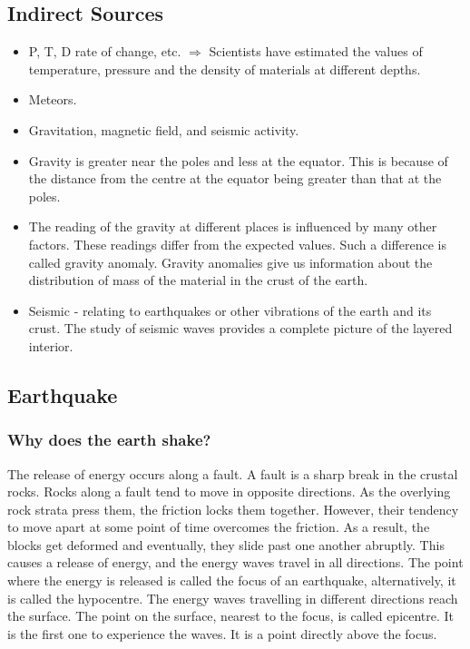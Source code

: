 \documentclass[8pt, a4paper, oneside, twocolumn]{extarticle}
\begin{document}
\subsection{Indirect Sources}
\begin{itemize}
  \item P, T, D rate of change, etc. $\Rightarrow$ Scientists have estimated the values of temperature, pressure and the density of materials at different depths.
  \item Meteors.
  \item Gravitation, magnetic field, and seismic activity.
  \item Gravity is greater near the poles and less at the equator. This is because of the distance from the centre at the equator being greater than that at the poles.
  \item The reading of the gravity at different places is influenced by many other factors. These readings differ from the expected values. Such a difference is called gravity anomaly. Gravity anomalies give us information about the distribution of mass of the material in the crust of the earth.
  \item Seismic - relating to earthquakes or other vibrations of the earth and its crust. The study of seismic waves provides a complete picture of the layered interior. 
  
\end{itemize}

\subsection{Earthquake}
\subsubsection{Why does the earth shake?}
The release of energy occurs along a fault. A fault is a sharp break in the crustal rocks. Rocks along a fault tend to move in opposite directions. As the overlying rock strata press them, the friction locks them together. However, their tendency to move apart at some point of time overcomes the friction. As a result, the blocks get deformed and eventually, they slide past one another abruptly. This causes a release of energy, and the energy waves travel in all directions. The point where the energy is released is called the focus of an earthquake, alternatively, it is called the hypocentre. The energy waves travelling in different directions reach the surface. The point on the surface, nearest to the focus, is called epicentre. It is the first one to experience the waves. It is a point directly above the focus.
\end{document}
